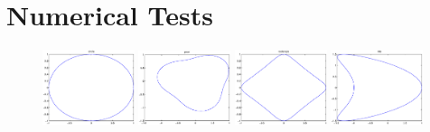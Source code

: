 \documentclass[12pt]{iopart}
\begin{document}
\section{Numerical Tests}
\begin{figure}
	\centering
	\includegraphics[width=0.24\textwidth]{./figure_sc/circle.eps}
	\includegraphics[width=0.24\textwidth]{./figure_sc/pear.eps}
	\includegraphics[width=0.24\textwidth]{./figure_sc/rectangle.eps}
	\includegraphics[width=0.24\textwidth]{./figure_sc/kite.eps}
	\caption{}\label{shape}
\end{figure}
\end{document}

